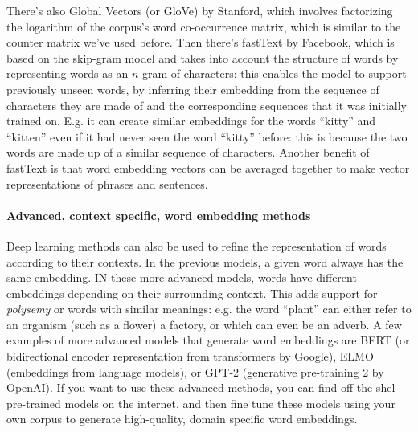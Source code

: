 \documentclass[12pt]{article}
\begin{document}
There's also Global Vectors (or GloVe) by Stanford, which involves factorizing the logarithm of the corpus's word co-occurrence matrix, which is similar to the counter matrix we've used before. Then there's fastText by Facebook, which is based on the skip-gram model and takes into account the structure of words by representing words as an $n$-gram of characters: this enables the model to support previously unseen words, by inferring their embedding from the sequence of characters they are made of and the corresponding sequences that it was initially trained on. E.g. it can create similar embeddings for the words ``kitty'' and ``kitten'' even if it had never seen the word ``kitty'' before: this is because the two words are made up of a similar sequence of characters. Another benefit of fastText is that word embedding vectors can be averaged together to make vector representations of phrases and sentences.

\paragraph{Advanced, context specific, word embedding methods}
Deep learning methods can also be used to refine the representation of words according to their contexts. In the previous models, a given word always has the same embedding. IN these more advanced models, words have different embeddings depending on their surrounding context. This adds support for \emph{polysemy} or words with similar meanings: e.g. the word ``plant'' can either refer to an organism (such as a flower) a factory, or which can even be an adverb. A few examples of more advanced models that generate word embeddings are BERT (or bidirectional encoder representation from transformers by Google), ELMO (embeddings from language models), or GPT-2 (generative pre-training 2 by OpenAI). If you want to use these advanced methods, you can find off the shel pre-trained models on the internet, and then fine tune these models using your own corpus to generate high-quality, domain specific word embeddings.
\end{document}
